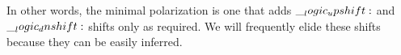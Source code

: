 In other words, the minimal polarization is one that adds $\__logic_upshift:$ and $\__logic_dnshift:$ shifts only as required.
We will frequently elide these shifts because they can be easily inferred.




